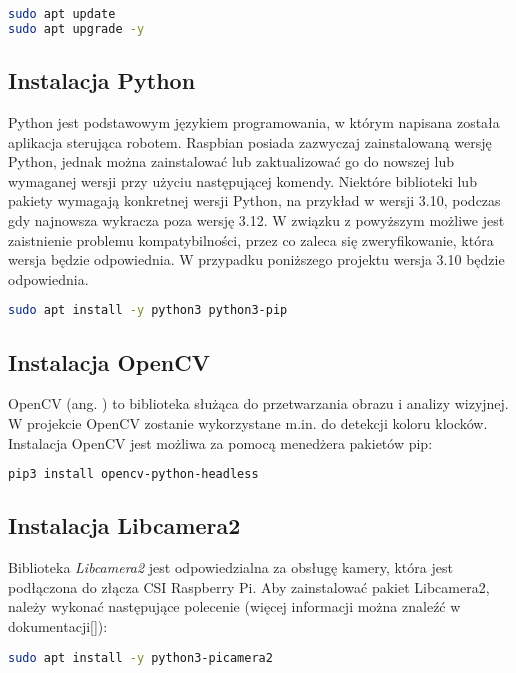 \begin{lstlisting}[language=bash]
sudo apt update
sudo apt upgrade -y
\end{lstlisting}

\subsection{Instalacja Python}
Python jest podstawowym językiem programowania, w którym napisana została aplikacja sterująca robotem. Raspbian posiada zazwyczaj zainstalowaną wersję Python, jednak można zainstalować lub zaktualizować go do nowszej lub wymaganej wersji przy użyciu następującej komendy. Niektóre biblioteki lub pakiety wymagają konkretnej wersji Python, na przykład w wersji 3.10, podczas gdy najnowsza wykracza poza wersję 3.12. W związku z powyższym możliwe jest zaistnienie problemu kompatybilności, przez co zaleca się zweryfikowanie, która wersja będzie odpowiednia. W przypadku poniższego projektu wersja 3.10 będzie odpowiednia. 

\begin{lstlisting}[language=bash]
sudo apt install -y python3 python3-pip
\end{lstlisting}

\subsection{Instalacja OpenCV}
OpenCV (ang. ) to biblioteka służąca do przetwarzania obrazu i analizy wizyjnej. W projekcie OpenCV zostanie wykorzystane m.in. do detekcji koloru klocków. Instalacja OpenCV jest możliwa za pomocą menedżera pakietów pip:

\begin{lstlisting}[language=bash]
pip3 install opencv-python-headless
\end{lstlisting}

\subsection{Instalacja Libcamera2}
Biblioteka \textit{Libcamera2} jest odpowiedzialna za obsługę kamery, która jest podłączona do złącza CSI Raspberry Pi. Aby zainstalować pakiet Libcamera2, należy wykonać następujące polecenie (więcej informacji można znaleźć w dokumentacji[\cite{bib:manualLibcamera2}]):

\begin{lstlisting}[language=bash]
    sudo apt install -y python3-picamera2
\end{lstlisting}

